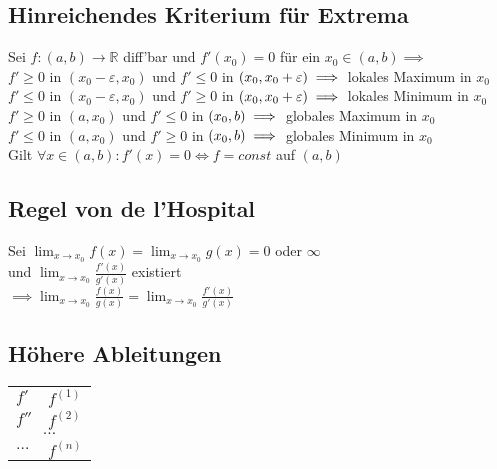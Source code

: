 \documentclass[a4paper,9pt]{extarticle}
\begin{document}
	\subsection*{Hinreichendes Kriterium für Extrema}
	Sei $f : (a,b) → \mathbb{R}$ diff'bar und $f'(x_0) = 0$ für ein $x_0 \in (a,b) \implies$ \\
	
	$f' ≥ 0 $ in $ (x_0 - \varepsilon,x_0)$ und $f' ≤ 0 $ in $ (x_0,x_0 + \varepsilon) \\ \implies$ lokales Maximum in $x_0$\\
	
	$f' ≤ 0 $ in $ (x_0 - \varepsilon,x_0)$ und $f' ≥ 0 $ in $ (x_0,x_0 + \varepsilon) \\ \implies$ lokales Minimum in $x_0$ \\
	
	$f' ≥ 0 $ in $ (a,x_0)$ und $f' ≤ 0 $ in $ (x_0,b) \\ \implies$ globales Maximum in $x_0$\\
	
	$f' ≤ 0 $ in $ (a,x_0)$ und $f' ≥ 0 $ in $ (x_0,b) \\ \implies$ globales Minimum in $x_0$\\
	
	Gilt $\forall x \in (a,b): f'(x) = 0 \iff f = const$ auf $(a,b)$
	
	\subsection*{Regel von de l'Hospital}
	Sei $\lim_{x → x_0} f(x) = \lim_{x → x_0} g(x) = 0$ oder $∞$ \\
	und $\lim_{x → x_0} \frac{f'(x)}{g'(x)}$ existiert \\
	$\implies \lim_{x → x_0} \frac{f(x)}{g(x)} = \lim_{x → x_0} \frac{f'(x)}{g'(x)}$
	
	\subsection*{Höhere Ableitungen}
	\begin{tabular}{l @{ $=$ } l}
		$f'$ & $f^{(1)}$ \\
		$f''$ & $f^{(2)}$ \\
		\multicolumn{2}{c}{$\dots$} \\
		$\dots$ & $f^{(n)}$ \\
	\end{tabular}\\
	~\\
	
\end{document}
